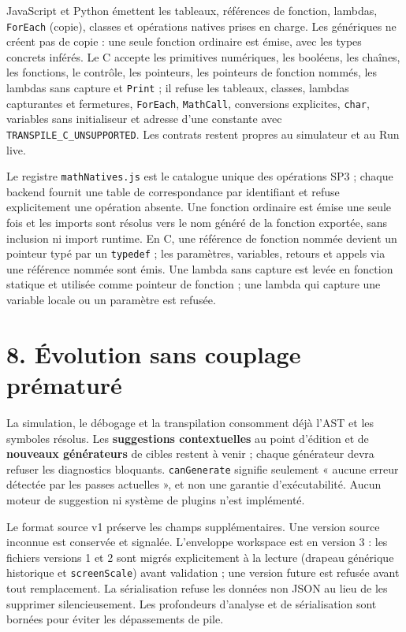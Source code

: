 \documentclass[11pt,a4paper]{article}
\newcommand{\code}[1]{\texttt{#1}}
\begin{document}
JavaScript et Python émettent les tableaux, références de fonction, lambdas, \code{ForEach} (copie), classes et opérations natives prises en charge. Les génériques ne créent pas de copie : une seule fonction ordinaire est émise, avec les types concrets inférés. Le C accepte les primitives numériques, les booléens, les chaînes, les fonctions, le contrôle, les pointeurs, les pointeurs de fonction nommés, les lambdas sans capture et \code{Print} ; il refuse les tableaux, classes, lambdas capturantes et fermetures, \code{ForEach}, \code{MathCall}, conversions explicites, \code{char}, variables sans initialiseur et adresse d'une constante avec \code{TRANSPILE\_C\_UNSUPPORTED}. Les contrats restent propres au simulateur et au Run live.

Le registre \code{mathNatives.js} est le catalogue unique des opérations SP3 ; chaque backend fournit une table de correspondance par identifiant et refuse explicitement une opération absente. Une fonction ordinaire est émise une seule fois et les imports sont résolus vers le nom généré de la fonction exportée, sans inclusion ni import runtime. En C, une référence de fonction nommée devient un pointeur typé par un \code{typedef} ; les paramètres, variables, retours et appels via une référence nommée sont émis. Une lambda sans capture est levée en fonction statique et utilisée comme pointeur de fonction ; une lambda qui capture une variable locale ou un paramètre est refusée.

\section*{8. Évolution sans couplage prématuré}
La simulation, le débogage et la transpilation consomment déjà l'AST et les
symboles résolus. Les \textbf{suggestions contextuelles} au point d'édition et
de \textbf{nouveaux générateurs} de cibles restent à venir ; chaque générateur
devra refuser les diagnostics bloquants. \code{canGenerate} signifie seulement
« aucune erreur détectée par les passes actuelles », et non une garantie
d'exécutabilité. Aucun moteur de suggestion ni système de plugins n'est
implémenté.

Le format source v1 préserve les champs supplémentaires. Une version source
inconnue est conservée et signalée. L'enveloppe workspace est en version 3 : les
fichiers versions 1 et 2 sont migrés explicitement à la lecture (drapeau générique
historique et \code{screenScale}) avant validation ; une version future est
refusée avant tout remplacement. La sérialisation refuse les données non JSON au
lieu de les supprimer silencieusement. Les profondeurs d'analyse et de
sérialisation sont bornées pour éviter les dépassements de pile.
\end{document}
